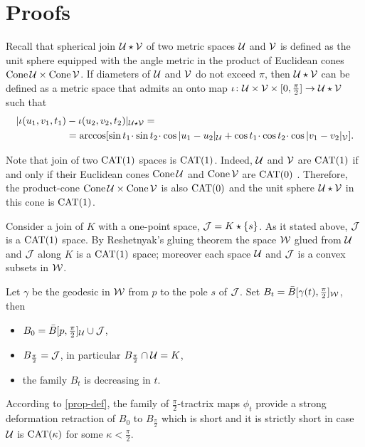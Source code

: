 \documentclass[oneside,a4paper, 12pt]{article}
\begin{document}
\section{Proofs}\label{sec:proofs}

Recall that spherical join $\mathcal{U}\star\mathcal{V}$ of two metric spaces $\mathcal{U}$ and $\mathcal{V}$
is defined as the unit sphere equipped with the angle metric in the product of Euclidean cones $\mathop{\rm Cone}\nolimits \mathcal{U}\times \mathop{\rm Cone}\nolimits\mathcal{V}$. 
If diameters of $\mathcal{U}$ and $\mathcal{V}$ do not exceed $\pi$, then $\mathcal{U}\star\mathcal{V}$
can be defined as a metric space that admits an onto map $\iota\colon\mathcal{U}\times\mathcal{V}\times[0,\tfrac\pi2]\to \mathcal{U}\star\mathcal{V}$ such that
\begin{align*}
|\iota(u_1,v_1,t_1)&-\iota(u_2,v_2,t_2)|_{\spc{U}\star\spc{V}}=
\\
&=\arccos[\sin t_1\cdot\sin t_2\cdot \cos|u_1-u_2|_{\spc{U}}+\cos t_1\cdot \cos t_2\cdot \cos|v_1-v_2|_{\spc{V}}].
\end{align*}

Note that join of two $\mathrm{CAT}(1)$ spaces is $\mathrm{CAT}(1)$.
Indeed, $\mathcal{U}$ and $\mathcal{V}$ are $\mathrm{CAT}(1)$ if and only if their Euclidean cones $\mathop{\rm Cone}\nolimits \mathcal{U}$ and $\mathop{\rm Cone}\nolimits\mathcal{V}$ are $\mathrm{CAT}(0)$ \cite[10.4.2]{akp}.
Therefore, the product-cone $\mathop{\rm Cone}\nolimits \mathcal{U}\times\mathop{\rm Cone}\nolimits\mathcal{V}$ is also $\mathrm{CAT}(0)$ and the unit sphere $\mathcal{U}\star\mathcal{V}$ in this cone is $\mathrm{CAT}(1)$.
 

Consider a join of  $K$ with a one-point space, $\mathcal{J}=K\star \{s\}$.
As it stated above, $\mathcal{J}$ is a $\mathrm{CAT}(1)$ space.
By Reshetnyak's gluing theorem \cite[8.9.1]{akp} the space $\mathcal{W}$ glued from ${\mathcal{U}}$ and $\mathcal{J}$ along $K$ is a $\mathrm{CAT}(1)$ space;
moreover each space ${\mathcal{U}}$ and $\mathcal{J}$ is a convex subsets in $\mathcal{W}$.

Let $\gamma$ be the geodesic in $\mathcal{W}$ from $p$ to the pole $s$ of $\mathcal{J}$.
Set $B_t=\bar B[\gamma(t),\tfrac\pi2]_{\mathcal{W}}$, then
\begin{itemize}
\item $B_0=\bar B[p,\tfrac\pi2]_{\mathcal{U}}\cup \mathcal{J}$,
\item $B_{\frac\pi2}=\mathcal{J}$, in particular $B_{\frac\pi2}\cap \mathcal{U}=K$,
\item the family $B_t$ is decreasing in $t$.
\end{itemize}
According to \ref{prop-def}, the family of $\tfrac\pi2$-tractrix maps $\phi_t$ provide a strong deformation retraction of $B_0$ to $B_{\frac\pi2}$ which is short and it is strictly short in case $\mathcal{U}$ is $\mathrm{CAT}(\kappa)$ for some $\kappa<\tfrac\pi2$.
\end{document}
